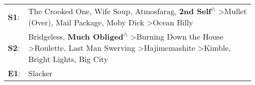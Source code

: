 \begin{supertabular}{p{0.03\textwidth}p{0.92\textwidth}}
 \textbf{S1}:  &                                                  The Crooked One\textsuperscript{}, \enspace Wife Soup\textsuperscript{}, \enspace Atmosfarag\textsuperscript{}, \enspace \textbf{2nd Self\textsuperscript{$\wedge$}} \textgreater \enspace Mullet (Over)\textsuperscript{}, \enspace Mail Package\textsuperscript{}, \enspace Moby Dick\textsuperscript{} \textgreater \enspace Ocean Billy\textsuperscript{}  \enspace  \\
 \textbf{S2}:  &  Bridgeless\textsuperscript{}, \enspace \textbf{Much Obliged\textsuperscript{$\wedge$}} \textgreater \enspace Burning Down the House\textsuperscript{} \textgreater \enspace Roulette\textsuperscript{}, \enspace Last Man Swerving\textsuperscript{} \textgreater \enspace Hajimemashite\textsuperscript{} \textgreater \enspace Kimble\textsuperscript{}, \enspace Bright Lights, Big City\textsuperscript{}  \enspace  \\
 \textbf{E1}:  &                                                                                                                                                                                                                                                                                                                                                                                      Slacker\textsuperscript{}  \enspace  \\
\end{supertabular}
